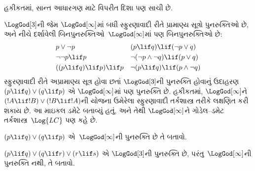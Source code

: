 હકીકતમાં, સાન્ત આધારગણ માટે વિપરીત દિશા પણ સાચી છે.

$\LogGod[3]$ની જેમ $\LogGod[\infty]$માં બધી સ્ફુરણાવાદી રીતે
પ્રામાણ્ય સૂત્રો પુનરુક્તિઓ છે, અને નીચે દર્શાવેલી
બિનપુનરુક્તિઓ~$\LogGod[\infty]$માં પણ બિનપુનરુક્તિઓ છે:
\begin{align*}
  & p \lor \lnot p && (p \lif q) \lif (\lnot p \lor q) \\
  & \lnot\lnot p \lif p && \lnot(\lnot p \land \lnot q) \lif (p \lor q) \\
  & ((p \lif q) \lif p) \lif p && \lnot(p \lif q) \lif (p \land \lnot q)
\end{align*}
સ્ફુરણાવાદી રીતે અપ્રામાણ્ય સૂત્ર હોવા છતાં $\LogGod[3]$ની પુનરુક્તિ
હોવાનું ઉદાહરણ $(p \lif q) \lor (q \lif p)$ એ
$\LogGod[\infty]$માં પણ પુનરુક્તિ છે. હકીકતમાં,
$\LogGod[\infty]$ને $(!A \lif !B) \lor (!B \lif !A)$ની
યોજના ઉમેરેલા સ્ફુરણાવાદી તર્કશાસ્ત્ર તરીકે લક્ષણિત
કરી શકાય છે. આ માઇકલ ડમેટે બતાવ્યું હતું, અને તેથી
$\LogGod[\infty]$ને ગોડેલ--ડમેટ તર્કશાસ્ત્ર~$\Log{LC}$ પણ કહે છે.

\begin{prob}
  $(p \lif q) \lor (q \lif p)$ એ~$\LogGod[\infty]$ની
  પુનરુક્તિ છે તે બતાવો.
\end{prob}

\begin{prob}
  $(p \lif q) \lor (q \lif r) \lor (r \lif s)$ એ
  $\LogGod[3]$ની પુનરુક્તિ છે, પરંતુ~$\LogGod[\infty]$ની
  પુનરુક્તિ નથી, તે બતાવો.
\end{prob}
\endgroup


\OLEndChapterHook
\endgroup


\begingroup
\makeatletter{}\makeatother

\label{guunit:OLP-0402}


\begingroup
\makeatletter{}\makeatother


\label{guunit:OLP-0403}


